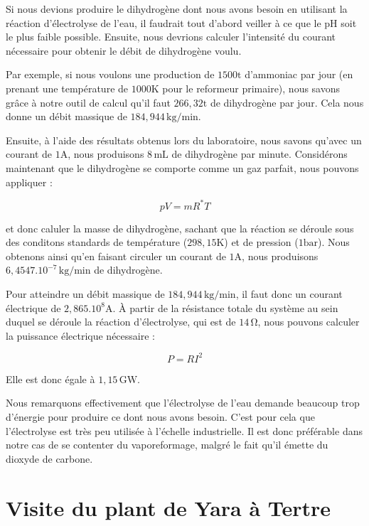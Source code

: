 \documentclass[a4paper, oneside, 12pt]{article}
\begin{document}
Si nous devions produire le dihydrogène dont nous avons besoin en utilisant la 
réaction d'électrolyse de l'eau, il faudrait tout d'abord veiller à ce que le pH soit le
plus faible possible. Ensuite, nous devrions calculer l'intensité du courant nécessaire
pour obtenir le débit de dihydrogène voulu.

Par exemple, si nous voulons une production de $1500 \si{\tonne}$ d'ammoniac par 
jour (en prenant une température de $1000 \si{\kelvin}$ pour le reformeur primaire),
nous savons grâce à notre outil de calcul qu'il faut $266,32 \si{\tonne}$ de dihydrogène
par jour. Cela nous donne un débit massique de $184,944 \, \si{\kilo\gram/\minute}$.

Ensuite, à l'aide des résultats obtenus lors du laboratoire, nous savons qu'avec 
un courant de $1 \si{\ampere}$, nous produisons $8 \, \si{\milli\liter}$ de dihydrogène
par minute. Considérons maintenant que le dihydrogène se comporte comme un gaz parfait,
nous pouvons appliquer :

\begin{equation*}
	pV = mR^{*}T
\end{equation*}

et donc caluler la masse de dihydrogène, sachant que la réaction se déroule sous 
des conditons standards de température ($298,15 \si{\kelvin}$) et de pression ($1 \si{\bar}$).
Nous obtenons ainsi qu'en faisant circuler un courant de $1 \si{\ampere}$,
nous produisons $6,4547.10^{-7} \, \si{\kilo\gram/\minute}$ de dihydrogène.

Pour atteindre un débit massique de $184,944 \, \si{\kilo\gram/\minute}$,
il faut donc un courant électrique de $2,865.10^8 \si{\ampere}$. À partir de la résistance
totale du système au sein duquel se déroule la réaction d'électrolyse,
qui est de $14 \, \si{\ohm}$, nous pouvons calculer la puissance électrique nécessaire : 

\begin{equation*}
	P = RI^{2}
\end{equation*}

Elle est donc égale à $1,15 \, \si{\giga\watt}$.

Nous remarquons effectivement que l'électrolyse de l'eau demande beaucoup trop d'énergie
pour produire ce dont nous avons besoin. C'est pour cela que l'électrolyse est très peu 
utilisée à l'échelle industrielle. Il est donc préférable dans notre cas de se contenter
du vaporeformage, malgré le fait qu'il émette du dioxyde de carbone.

\section{Visite du plant de Yara à Tertre}
\end{document}
